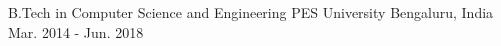 \begin{cventries}
	\cventry
	{B.Tech in Computer Science and Engineering}
	{PES University}
	{Bengaluru, India}
	{Mar. 2014 - Jun. 2018}
	{}
\end{cventries}